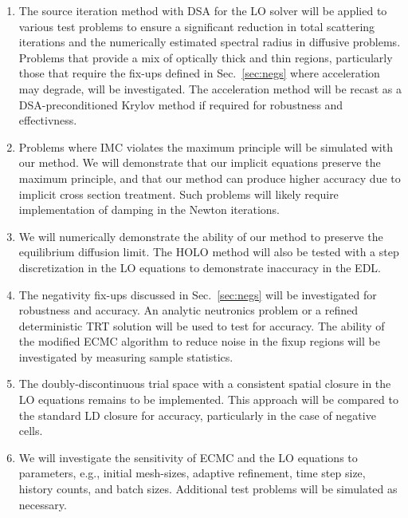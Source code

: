 \documentclass[11pt]{article}
\begin{document}
\begin{enumerate}
    \item The source iteration method with DSA for the LO solver will be applied to
        various test problems to ensure a significant reduction in total scattering
        iterations and the numerically estimated spectral radius in diffusive problems.  Problems that provide a mix of optically
        thick and thin regions, particularly those that require the fix-ups defined in
        Sec.~\ref{sec:negs} where acceleration may degrade, will be
        investigated.  The acceleration method will be recast as a
        DSA-preconditioned Krylov method if required for robustness and effectivness.
    \item Problems where IMC violates the maximum principle will be simulated with our
        method.  We will demonstrate that our implicit equations preserve the maximum
        principle, and that our method can produce higher accuracy due to implicit cross section
        treatment. Such problems will likely require implementation of damping in the
        Newton iterations.
    \item We will numerically demonstrate the ability of our method to preserve
        the equilibrium diffusion limit.  The HOLO method will also be tested with a step
        discretization in the LO equations to demonstrate inaccuracy in the EDL.
    \item The negativity fix-ups discussed in Sec.~\ref{sec:negs} will be investigated for robustness and
        accuracy.   An analytic neutronics problem or a refined deterministic TRT solution
        will be used to test for accuracy.  The ability of the modified ECMC
        algorithm to reduce noise in
        the fixup regions will be investigated by measuring sample statistics.
    \item The doubly-discontinuous trial space with a consistent spatial closure in the
        LO equations remains to be implemented. This approach will be compared to the
        standard LD closure for accuracy, particularly in the case of negative cells.  
    \item We will investigate the sensitivity of ECMC and the LO equations to
        parameters, e.g., initial mesh-sizes, adaptive refinement, time step size, history
        counts, and batch sizes.  Additional test problems will be simulated as
        necessary.
\end{enumerate}
\pagebreak


\begin{spacing}{1}
  
  
\end{spacing}
\end{document}

